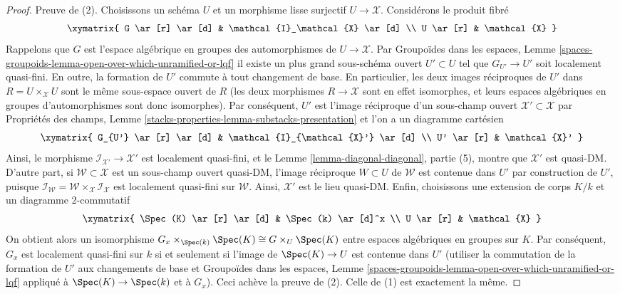 \begin{proof}
Preuve de (2). Choisissons un schéma $U$ et un morphisme lisse surjectif
$U \to \mathcal{X}$. Considérons le produit fibré
$$
\xymatrix{
G \ar[r] \ar[d] & \mathcal{I}_\mathcal{X} \ar[d] \\
U \ar[r] & \mathcal{X}
}
$$
Rappelons que $G$ est l'espace algébrique en groupes des automorphismes de
$U \to \mathcal{X}$. Par Groupoïdes dans les espaces, Lemme
\ref{spaces-groupoids-lemma-open-over-which-unramified-or-lqf}
il existe un plus grand sous-schéma ouvert $U' \subset U$ tel que
$G_{U'} \to U'$ soit localement quasi-fini.
En outre, la formation de $U'$ commute à tout changement de base.
En particulier, les deux images réciproques de $U'$ dans
$R = U \times_\mathcal{X} U$ sont le même sous-espace ouvert de $R$
(les deux morphismes $R \to \mathcal{X}$ sont en effet isomorphes, et leurs
espaces algébriques en groupes d'automorphismes sont donc isomorphes).
Par conséquent, $U'$ est l'image réciproque d'un sous-champ ouvert
$\mathcal{X}' \subset \mathcal{X}$ par Propriétés des champs, Lemme
\ref{stacks-properties-lemma-substacks-presentation}
et l'on a un diagramme cartésien
$$
\xymatrix{
G_{U'} \ar[r] \ar[d] & \mathcal{I}_{\mathcal{X}'} \ar[d] \\
U' \ar[r] & \mathcal{X}'
}
$$
Ainsi, le morphisme $\mathcal{I}_{\mathcal{X}'} \to \mathcal{X}'$ est
localement quasi-fini, et le Lemme \ref{lemma-diagonal-diagonal}, partie (5),
montre que $\mathcal{X}'$ est quasi-DM. D'autre part, si
$\mathcal{W} \subset \mathcal{X}$ est un sous-champ ouvert quasi-DM,
l'image réciproque $W \subset U$ de $\mathcal{W}$ est contenue dans $U'$
par construction de $U'$, puisque
$\mathcal{I}_\mathcal{W} =
\mathcal{W} \times_\mathcal{X} \mathcal{I}_\mathcal{X}$
est localement quasi-fini sur $\mathcal{W}$.
Ainsi, $\mathcal{X}'$ est le lieu quasi-DM.
Enfin, choisissons une extension de corps $K/k$ et un diagramme
$2$-commutatif
$$
\xymatrix{
\Spec(K) \ar[r] \ar[d] & \Spec(k) \ar[d]^x \\
U \ar[r] & \mathcal{X}
}
$$
On obtient alors un isomorphisme
$G_x \times_{\Spec(k)} \Spec(K) \cong G \times_U \Spec(K)$
entre espaces algébriques en groupes sur $K$. Par conséquent, $G_x$ est
localement quasi-fini sur $k$ si et seulement si l'image de
$\Spec(K) \to U$ est contenue dans $U'$ (utiliser la commutation de la
formation de $U'$ aux changements de base et Groupoïdes dans les espaces,
Lemme
\ref{spaces-groupoids-lemma-open-over-which-unramified-or-lqf}
appliqué à $\Spec(K) \to \Spec(k)$ et à $G_x$).
Ceci achève la preuve de (2). Celle de (1) est exactement la même.
\end{proof}









